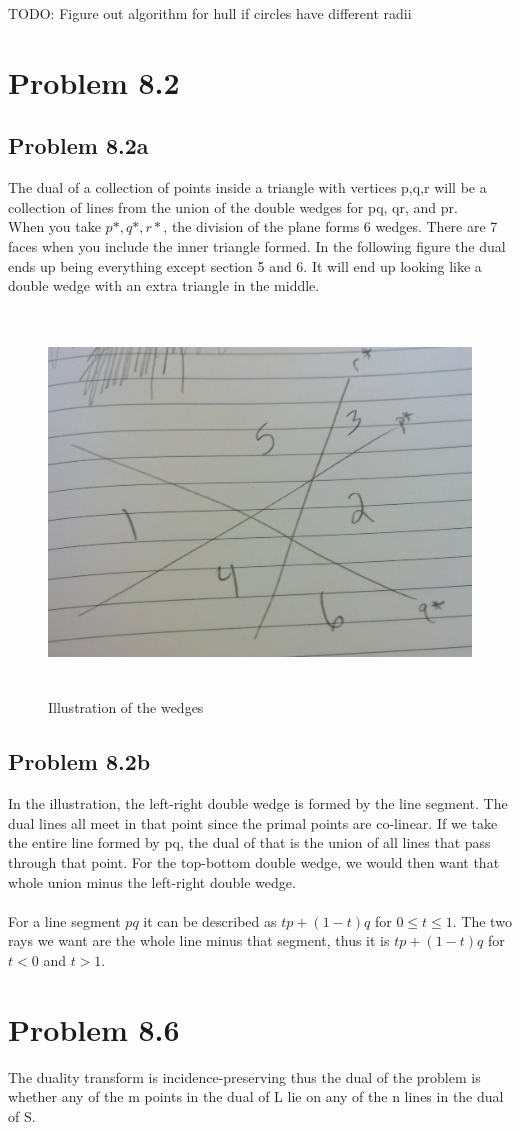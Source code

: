 \documentclass[11pt,psfig]{article}
\begin{document}
TODO: Figure out algorithm for hull if circles have different radii


\section*{Problem 8.2}

\subsection*{Problem 8.2a}

The dual of a collection of points inside a triangle with vertices p,q,r will be a collection of lines from the union of the double wedges for pq, qr, and pr. 
\\
When you take $p*, q*, r*$, the division of the plane forms 6 wedges. There are 7 faces when you include the inner triangle formed. In the following figure the dual ends up being everything except section 5 and 6. It will end up looking like a double wedge with an extra triangle in the middle. 

\begin{figure}[H]
\centering
\includegraphics[height=4in]{cs266dual.jpg}
\caption{Illustration of the wedges}
\end{figure}

\subsection*{Problem 8.2b}

In the illustration, the left-right double wedge is formed by the line segment. The dual lines all meet in that point since the primal points are co-linear. If we take the entire line formed by pq, the dual of that is the union of all lines that pass through that point. For the top-bottom double wedge, we would then want that whole union minus the left-right double wedge. \\
\\
For a line segment $pq$ it can be described as ${tp + (1-t)q}$ for $0 \leq t \leq 1$. The two rays we want are the whole line minus that segment, thus it is ${tp + (1-t)q}$ for $t < 0$ and $t > 1$. 

\section*{Problem 8.6}

The duality transform is incidence-preserving thus the dual of the problem is whether any of the m points in the dual of L lie on any of the n lines in the dual of S. 
\end{document}
